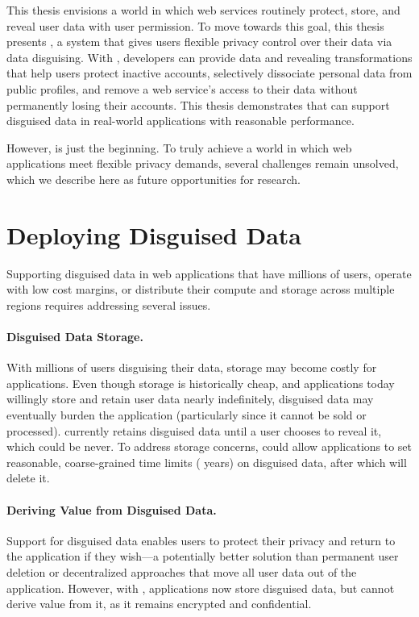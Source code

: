 This thesis envisions a world in which web services routinely
protect, store, and reveal \xxed user data with user permission.
%
To move towards this goal, this thesis presents \sys, a system that gives users 
flexible privacy control over their data via data disguising.
%
With \sys, developers can provide data \xxing and revealing transformations that
help users protect inactive accounts, selectively dissociate personal data from
public profiles, and remove a web service's access to their data without
permanently losing their accounts.
%
This thesis demonstrates that \sys can support disguised data in real-world
applications with reasonable performance.
%

%
However, \sys is just the beginning. To truly achieve a world in which web
applications meet flexible privacy demands, several challenges remain unsolved,
which we describe here as future opportunities for research.
%

\section{Deploying Disguised Data}
\label{s:deploying}

Supporting disguised data in web applications that have millions of users,
operate with low cost margins, or distribute their compute and storage
across multiple regions requires addressing several issues.

%
\paragraph{Disguised Data Storage.} 
With millions of users disguising their data, storage may become costly for
applications.
%
Even though storage is historically cheap, and applications today willingly
store and retain user data nearly indefinitely, disguised data may eventually
burden the application (particularly since it cannot be sold or processed).
%
\sys currently retains disguised data until a user
chooses to reveal it, which could be never.
%
To address storage concerns, \sys could allow applications to set reasonable,
coarse-grained time limits ( years) on disguised data, after which \sys
will delete it.
%

%
\paragraph{Deriving Value from Disguised Data.} 
%
Support for disguised data enables users to protect their privacy and return to
the application if they wish---a potentially better solution than permanent user
deletion or decentralized approaches that move all user data out of the
application. However, with \sys, applications now store disguised data, but
cannot derive value from it, as it remains encrypted and confidential.

